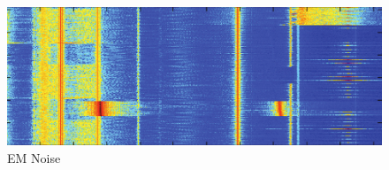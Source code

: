 \begin{figure}
	\centering
	\includegraphics[width=0.7\linewidth]{images/noise}
	\caption[EM Noise]{EM Noise}
	\label{fig:noise}
\end{figure}
